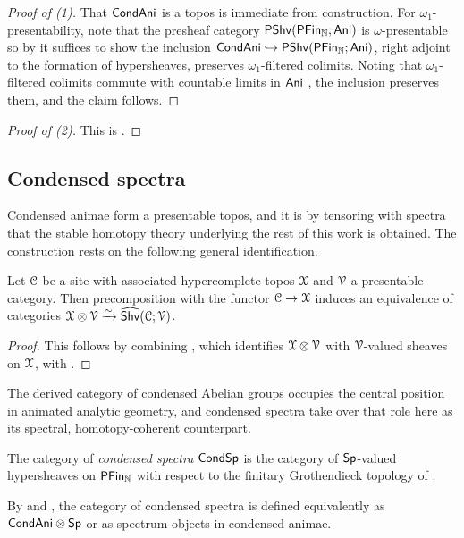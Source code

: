 \begin{proof}[Proof of (1)]
    That $\mathsf{Cond}\mathsf{Ani}$ is a topos is immediate from construction. For $\omega_{1}$-presentability, note that the presheaf category $\mathsf{PShv}(\mathsf{PFin}_{\mathbb{N}};\mathsf{Ani})$ is $\omega$-presentable so by \cite[Lem. 5.5.1.4]{HTT} it suffices to show the inclusion $\mathsf{Cond}\mathsf{Ani}\hookrightarrow\mathsf{PShv}(\mathsf{PFin}_{\mathbb{N}};\mathsf{Ani})$, right adjoint to the formation of hypersheaves, preserves $\omega_{1}$-filtered colimits. Noting that $\omega_{1}$-filtered colimits commute with countable limits in $\mathsf{Ani}$ \cite[Prop. 5.3.3.3]{HTT}, the inclusion preserves them, and the claim follows. 
\end{proof}
\begin{proof}[Proof of (2)]
    This is \cite[Lem. 4.9]{ClausenLie}. 
\end{proof}
\subsection{Condensed spectra}\label{subsec: condensed spectra}
Condensed animae form a presentable topos, and it is by tensoring with spectra that the stable homotopy theory underlying the rest of this work is obtained. The construction rests on the following general identification. 
\begin{proposition}\label{prop: hypersheaves as tensor}
    Let $\EuScript{C}$ be a site with associated hypercomplete topos $\EuScript{X}$ and $\EuScript{V}$ a presentable category. Then precomposition with the functor $\EuScript{C}\to\EuScript{X}$ induces an equivalence of categories $\EuScript{X}\otimes\EuScript{V}\xrightarrow{\sim}\widehat{\mathsf{Shv}}(\EuScript{C};\EuScript{V})$. 
\end{proposition}
\begin{proof}
    This follows by combining \cite[Rmk. 1.3.1.6]{SAG}, which identifies $\EuScript{X}\otimes\EuScript{V}$ with $\EuScript{V}$-valued sheaves on $\EuScript{X}$, with \cite[Lem. A.4.22]{HeyerMann6FF}. 
\end{proof}
The derived category of condensed Abelian groups occupies the central position in animated analytic geometry, and condensed spectra take over that role here as its spectral, homotopy-coherent counterpart. 
\begin{definition}\label{def: condensed spectra}
    The category of \emph{condensed spectra} $\mathsf{Cond}\mathsf{Sp}$ is the category of $\mathsf{Sp}$-valued hypersheaves on $\mathsf{PFin}_{\mathbb{N}}$ with respect to the finitary Grothendieck topology of . 
\end{definition}
\begin{remark}\label{rmk: characterizations of CondSp}
    By  and \cite[Rmk. 1.3.2.2]{SAG}, the category of condensed spectra is defined equivalently as $\mathsf{Cond}\mathsf{Ani}\otimes\mathsf{Sp}$ or as spectrum objects in condensed animae. 
\end{remark}
